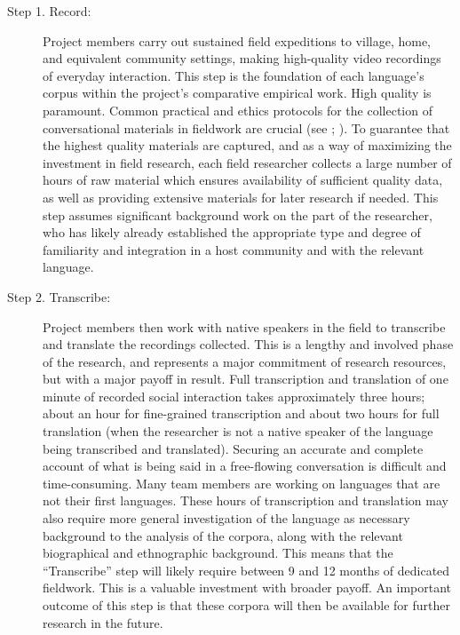 \documentclass[output=paper,modfonts,nonflat]{langsci/langscibook}
\begin{document}
\begin{description}
\sloppy
    \item[Step 1. Record:] Project members carry out sustained field expeditions to village, home, and equivalent community settings, making high-quality video re\-cord\-ings of everyday interaction. This step is the foundation of each language’s corpus within the project’s comparative empirical work. High quality is paramount. Common practical and ethics protocols for the collection of conversational materials in fieldwork are crucial (see \citealt{Enfield2014a}; \citealt{DingemanseEnfield2015}). To guarantee that the highest quality materials are captured, and as a way of maximizing the investment in field research, each field researcher collects a large number of hours of raw material which ensures availability of sufficient quality data, as well as providing extensive materials for later research if needed. This step assumes significant background work on the part of the researcher, who has likely already established the appropriate type and degree of familiarity and integration in a host community and with the relevant language.
\fussy
    \item[Step 2. Transcribe:] Project members then work with native speakers in the field to transcribe and translate the recordings collected. This is a lengthy and involved phase of the research, and represents a major commitment of research resources, but with a major payoff in result. Full transcription and translation of one minute of recorded social interaction takes approximately three hours; about an hour for fine-grained transcription and about two hours for full translation (when the researcher is not a native speaker of the language being transcribed and translated). Securing an accurate and complete account of what is being said in a free-flowing conversation is difficult and time-consuming. Many team members are working on languages that are not their first languages. These hours of transcription and translation may also require more general investigation of the language as necessary background to the analysis of the corpora, along with the relevant biographical and ethnographic background. This means that the “Transcribe” step will likely require between 9 and 12 months of dedicated fieldwork. This is a valuable investment with broader payoff. An important outcome of this step is that these corpora will then be available for further research in the future.

\end{description}
\end{document}
